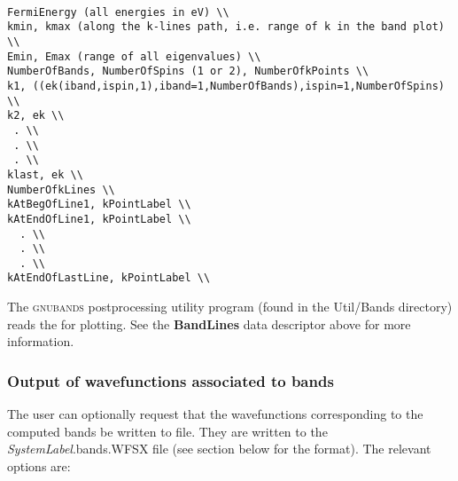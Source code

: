 \begin{verbatim}

FermiEnergy (all energies in eV) \\
kmin, kmax (along the k-lines path, i.e. range of k in the band plot) \\
Emin, Emax (range of all eigenvalues) \\
NumberOfBands, NumberOfSpins (1 or 2), NumberOfkPoints \\
k1, ((ek(iband,ispin,1),iband=1,NumberOfBands),ispin=1,NumberOfSpins) \\
k2, ek \\
 . \\
 . \\
 . \\
klast, ek \\
NumberOfkLines \\
kAtBegOfLine1, kPointLabel \\
kAtEndOfLine1, kPointLabel \\
  . \\
  . \\
  . \\
kAtEndOfLastLine, kPointLabel \\
\end{verbatim}

\noindent
The \textsc{gnubands} postprocessing
utility program (found in the Util/Bands directory) reads the
 for plotting.  See the \textbf{BandLines} data
descriptor above for more information.

\subsubsection{Output of wavefunctions associated to bands}
\label{sec:wf-bands}

The user can optionally request that the wavefunctions corresponding
to the computed bands be written to file. 
They are written to the \textit{SystemLabel}.bands.WFSX file
(see section below for the
format). The relevant options are:

